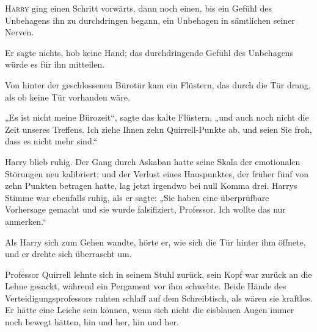 
\lettrine{H}{arry} ging einen Schritt vorwärts, dann noch einen, bis ein Gefühl des Unbehagens ihn zu durchdringen begann, ein Unbehagen in sämtlichen seiner Nerven.

Er sagte nichts, hob keine Hand; das durchdringende Gefühl des Unbehagens würde es für ihn mitteilen.

Von hinter der geschlossenen Bürotür kam ein Flüstern, das durch die Tür drang, als ob keine Tür vorhanden wäre.

„Es ist nicht meine Bürozeit“, sagte das kalte Flüstern, „und auch noch nicht die Zeit unseres Treffens. Ich ziehe Ihnen zehn Quirrell-Punkte ab, und seien Sie froh, dass es nicht mehr sind.“

Harry blieb ruhig. Der Gang durch Askaban hatte seine Skala der emotionalen Störungen neu kalibriert; und der Verlust eines Hauspunktes, der früher fünf von zehn Punkten betragen hatte, lag jetzt irgendwo bei null Komma drei. Harrys Stimme war ebenfalls ruhig, als er sagte:
„Sie haben eine überprüfbare Vorhersage gemacht und sie wurde falsifiziert, Professor. Ich wollte das nur anmerken.“

Als Harry sich zum Gehen wandte, hörte er, wie sich die Tür hinter ihm öffnete, und er drehte sich überrascht um.

Professor Quirrell lehnte sich in seinem Stuhl zurück, sein Kopf war zurück an die Lehne gesackt, während ein Pergament vor ihm schwebte. Beide Hände des Verteidigungsprofessors ruhten schlaff auf dem Schreibtisch, als wären sie kraftlos. Er hätte eine Leiche sein können, wenn sich nicht die eisblauen Augen immer noch bewegt hätten, hin und her, hin und her.

